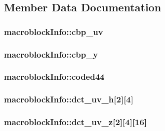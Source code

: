 \subsection{Member Data Documentation}
\hypertarget{structmacroblock_info_ae4618a11a8f0f396fb05879125bc449a}{
\subsubsection[{cbp\_\-uv}]{ {\bf macroblockInfo::cbp\_\-uv}}}
\label{structmacroblock_info_ae4618a11a8f0f396fb05879125bc449a}
\hypertarget{structmacroblock_info_a39296ecdc137fb62501453716a0330ac}{
\subsubsection[{cbp\_\-y}]{ {\bf macroblockInfo::cbp\_\-y}}}
\label{structmacroblock_info_a39296ecdc137fb62501453716a0330ac}
\hypertarget{structmacroblock_info_a8c2dc78f061142480ef5b2026b8a1dff}{
\subsubsection[{coded44}]{ {\bf macroblockInfo::coded44}}}
\label{structmacroblock_info_a8c2dc78f061142480ef5b2026b8a1dff}
\hypertarget{structmacroblock_info_a973346c837d8cf284586c33b4a4d478a}{
\subsubsection[{dct\_\-uv\_\-h}]{ {\bf macroblockInfo::dct\_\-uv\_\-h}\mbox{[}2\mbox{]}\mbox{[}4\mbox{]}}}
\label{structmacroblock_info_a973346c837d8cf284586c33b4a4d478a}
\hypertarget{structmacroblock_info_a01c5c766f5445434369110a34cd1594e}{
\subsubsection[{dct\_\-uv\_\-z}]{ {\bf macroblockInfo::dct\_\-uv\_\-z}\mbox{[}2\mbox{]}\mbox{[}4\mbox{]}\mbox{[}16\mbox{]}}}

